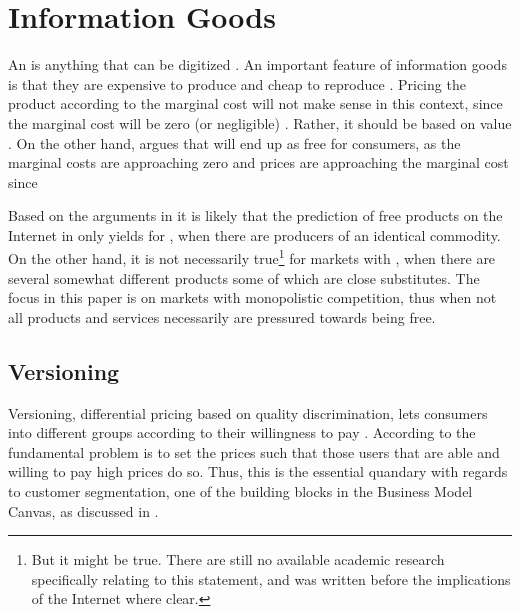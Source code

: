\section{Information Goods}


An  is anything that can be digitized \citep{varian1999}. An important feature of information goods is that they are expensive to produce and cheap to reproduce \citep{varian1995,varian1997}. Pricing the product according to the marginal cost will not make sense in this context, since the marginal cost will be zero (or negligible) \citep{varian1997,shapiro1999,mahadevan2000}. Rather, it should be based on value \citep{varian1997}. On the other hand, \citet{anderson2009} argues that  will end up as free for consumers, as the marginal costs are approaching zero and prices are approaching the marginal cost since 

Based on the arguments in \citet{varian1995} it is likely that the prediction of free products on the Internet in \citet{anderson2009} only yields for , \ie when there are  producers of an identical commodity. On the other hand, it is not necessarily true\footnote{But it might be true. There are still no available academic research specifically relating to this statement, and \citet{varian1995} was written before the implications of the Internet where clear.} for markets with , \ie when there are several somewhat different products some of which are close substitutes. The focus in this paper is on markets with monopolistic competition, thus when not all products and services necessarily are pressured towards being free.

\subsection{Versioning}
\label{section:informationgoods:versioning}

Versioning, \ie differential pricing based on quality discrimination, lets consumers  into different groups according to their willingness to pay \citep{varian1997}. According to \citet{varian1997} the fundamental problem is to set the prices such that those users that are able and willing to pay high prices do so. Thus, this is the essential quandary with regards to customer segmentation, one of the building blocks in the Business Model Canvas, as discussed in .


